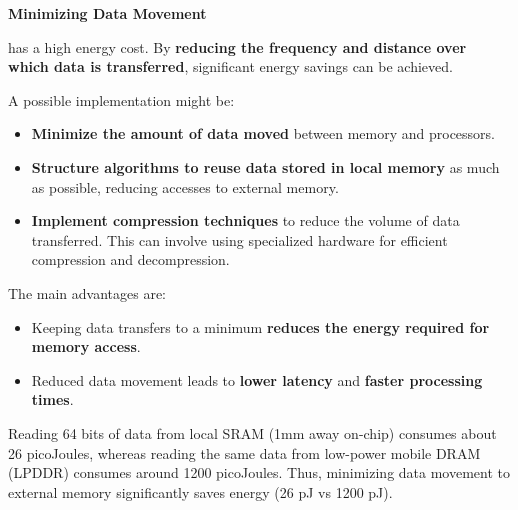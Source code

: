 \newpage

\begin{flushleft}
    \textcolor{Green3}{ \textbf{Minimizing Data Movement}}
\end{flushleft}
 has a high energy cost. By \textbf{reducing the frequency and distance over which data is transferred}, significant energy savings can be achieved.

\highspace
A possible implementation might be:
\begin{itemize}
    \item \textbf{Minimize the amount of data moved} between memory and processors.
    \item \textbf{Structure algorithms to reuse data stored in local memory} as much as possible, reducing accesses to external memory.
    \item \textbf{Implement compression techniques} to reduce the volume of data transferred. This can involve using specialized hardware for efficient compression and decompression.
\end{itemize}
The main advantages are:
\begin{itemize}[label=\textcolor{Green3}{}]
    \item Keeping data transfers to a minimum \textbf{reduces the energy required for memory access}.
    \item Reduced data movement leads to \textbf{lower latency} and \textbf{faster processing times}.
\end{itemize}

\begin{examplebox}
    Reading 64 bits of data from local SRAM (1mm away on-chip) consumes about 26 picoJoules, whereas reading the same data from low-power mobile DRAM (LPDDR) consumes around 1200 picoJoules. Thus, minimizing data movement to external memory significantly saves energy (26 pJ vs 1200 pJ).
\end{examplebox}

\newpage

